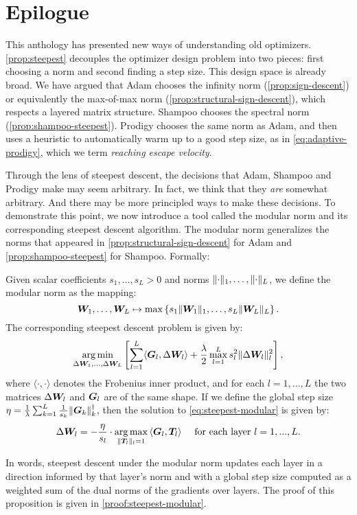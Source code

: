 \section*{Epilogue}
\label{sec:epilogue}

This anthology has presented new ways of understanding old optimizers. \cref{prop:steepest} decouples the optimizer design problem into two pieces: first choosing a norm and second finding a step size. This design space is already broad. We have argued that Adam chooses the infinity norm (\cref{prop:sign-descent}) or equivalently the max-of-max norm (\cref{prop:structural-sign-descent}), which respects a layered matrix structure. Shampoo chooses the spectral norm (\cref{prop:shampoo-steepest}). Prodigy chooses the same norm as Adam, and then uses a heuristic to automatically warm up to a good step size, as in \cref{eq:adaptive-prodigy}, which we term \textit{reaching escape velocity}.

Through the lens of steepest descent, the decisions that Adam, Shampoo and Prodigy make may seem arbitrary. In fact, we think that they \textit{are} somewhat arbitrary. And there may be more principled ways to make these decisions. To demonstrate this point, we now introduce a tool called the modular norm \citep{modula} and its corresponding steepest descent algorithm. The modular norm generalizes the norms that appeared in \cref{prop:structural-sign-descent} for Adam and \cref{prop:shampoo-steepest} for Shampoo. Formally:
\begin{myproposition}\label{prop:steepest-modular} Given scalar coefficients $s_1, \dots, s_L > 0$ and norms $\Vert {\cdot} \Vert_1, \dots, \Vert {\cdot} \Vert_L$, we define the modular norm as the mapping:
\begin{equation}
     {\bm{W}}_1, \dots, {\bm{W}}_L \mapsto \max\left\{s_1 \Vert {{\bm{W}}_1} \Vert_1, \dots, s_L \Vert {{\bm{W}}_L} \Vert_L \right\}.
\end{equation}
The corresponding steepest descent problem is given by:
\begin{equation}\label{eq:steepest-modular}
    \operatorname*{arg\,min}_{\Delta {\bm{W}}_1, \dots, \Delta {\bm{W}}_L} \left[ \sum_{l=1}^L \langle {\bm{G}}_l, \Delta {\bm{W}}_l \rangle + \frac{\lambda}{2} \max_{l=1}^L s_l^2 \Vert {\Delta{\bm{W}}_l} \Vert_l^2 \right],
\end{equation}
where $\langle\cdot, \cdot\rangle$ denotes the Frobenius inner product, and for each $l=1,...,L$ the two matrices $\Delta {\bm{W}}_l$ and ${\bm{G}}_l$ are of the same shape. If we define the global step size $\eta = \frac{1}{\lambda}\sum_{k=1}^L \frac{1}{s_k}\Vert {{\bm{G}}_k} \Vert_k^\dagger$, then the solution to \cref{eq:steepest-modular} is given by:
\begin{align}
    \Delta {\bm{W}}_l = - \frac{\eta}{s_l}\cdot \operatorname*{arg\,max}_{\Vert {{\bm{T}}_l} \Vert_l=1} \, \langle{\bm{G}}_l, {\bm{T}}_l\rangle \quad\text{ for each layer } l = 1,...,L.
\end{align}
\end{myproposition}
In words, steepest descent under the modular norm updates each layer in a direction informed by that layer's norm and with a global step size computed as a weighted sum of the dual norms of the gradients over layers. The proof of this proposition is given in \cref{proof:steepest-modular}.


